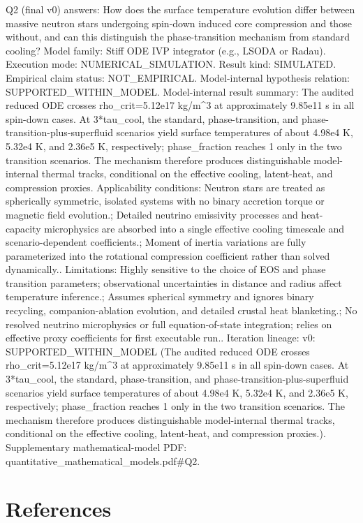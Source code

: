 \documentclass[conference]{IEEEtran}
\begin{document}
Q2 (final v0) answers: How does the surface temperature evolution differ between massive neutron stars undergoing spin-down induced core compression and those without, and can this distinguish the phase-transition mechanism from standard cooling? Model family: Stiff ODE IVP integrator (e.g., LSODA or Radau). Execution mode: NUMERICAL\_SIMULATION. Result kind: SIMULATED. Empirical claim status: NOT\_EMPIRICAL. Model-internal hypothesis relation: SUPPORTED\_WITHIN\_MODEL. Model-internal result summary: The audited reduced ODE crosses rho\_crit=5.12e17 kg/m\textasciicircum{}3 at approximately 9.85e11 s in all spin-down cases. At 3*tau\_cool, the standard, phase-transition, and phase-transition-plus-superfluid scenarios yield surface temperatures of about 4.98e4 K, 5.32e4 K, and 2.36e5 K, respectively; phase\_fraction reaches 1 only in the two transition scenarios. The mechanism therefore produces distinguishable model-internal thermal tracks, conditional on the effective cooling, latent-heat, and compression proxies. Applicability conditions: Neutron stars are treated as spherically symmetric, isolated systems with no binary accretion torque or magnetic field evolution.; Detailed neutrino emissivity processes and heat-capacity microphysics are absorbed into a single effective cooling timescale and scenario-dependent coefficients.; Moment of inertia variations are fully parameterized into the rotational compression coefficient rather than solved dynamically.. Limitations: Highly sensitive to the choice of EOS and phase transition parameters; observational uncertainties in distance and radius affect temperature inference.; Assumes spherical symmetry and ignores binary recycling, companion-ablation evolution, and detailed crustal heat blanketing.; No resolved neutrino microphysics or full equation-of-state integration; relies on effective proxy coefficients for first executable run.. Iteration lineage: v0: SUPPORTED\_WITHIN\_MODEL (The audited reduced ODE crosses rho\_crit=5.12e17 kg/m\textasciicircum{}3 at approximately 9.85e11 s in all spin-down cases. At 3*tau\_cool, the standard, phase-transition, and phase-transition-plus-superfluid scenarios yield surface temperatures of about 4.98e4 K, 5.32e4 K, and 2.36e5 K, respectively; phase\_fraction reaches 1 only in the two transition scenarios. The mechanism therefore produces distinguishable model-internal thermal tracks, conditional on the effective cooling, latent-heat, and compression proxies.). Supplementary mathematical-model PDF: quantitative\_mathematical\_models.pdf\#Q2.\section*{References}


\end{document}
